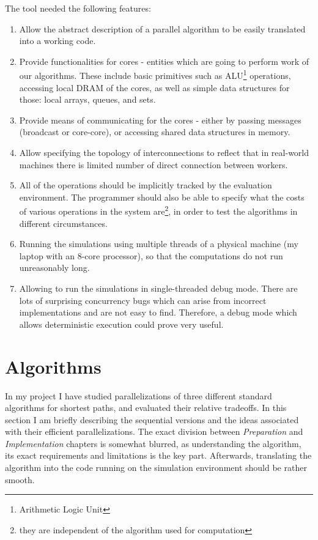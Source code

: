 \documentclass[12pt,a4paper,twoside,openright]{report}
\begin{document}
The tool needed the following features:

\begin{enumerate}
    \item Allow the abstract description of a parallel algorithm to be easily translated into a working code.
    \item Provide functionalities for cores - entities which are going to perform work of our algorithms. These include basic primitives such as ALU\footnote{Arithmetic Logic Unit} operations, accessing local DRAM of the cores, as well as simple data structures for those: local arrays, queues, and sets. 
    \item Provide means of communicating for the cores - either by passing messages (broadcast or core-core), or accessing shared data structures in memory.
    \item Allow specifying the topology of interconnections to reflect that in real-world machines there is limited number of direct connection between workers.
    \item All of the operations should be implicitly tracked by the evaluation environment. The programmer should also be able to specify what the costs of various operations in the system are\footnote{they are independent of the algorithm used for computation}, in order to test the algorithms in different circumstances.
    \item Running the simulations using multiple threads of a physical machine (my laptop with an $8$-core processor), so that the computations do not run unreasonably long.
    \item Allowing to run the simulations in single-threaded debug mode. There are lots of surprising concurrency bugs which can arise from incorrect implementations and are not easy to find. Therefore, a debug mode which allows deterministic execution could prove very useful.
\end{enumerate}

\section{Algorithms}
In my project I have studied parallelizations of three different standard algorithms for shortest paths, and evaluated their relative tradeoffs. In this section I am briefly describing the sequential versions and the ideas associated with their efficient parallelizations. The exact division between \textit{Preparation} and \textit{Implementation} chapters is somewhat blurred, as understanding the algorithm, its exact requirements and limitations is the key part. Afterwards, translating the algorithm into the code running on the simulation environment should be rather smooth.
\end{document}
